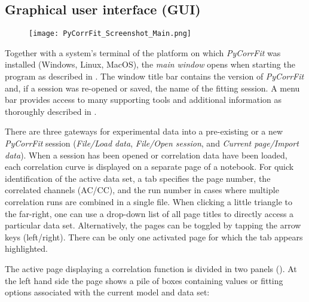 \subsection{Graphical user interface (GUI)}
\label{sec:intro.graph}
\begin{figure}[h]
\centering
\texttt{[image: PyCorrFit\_Screenshot\_Main.png]}
\end{figure}
Together with a system's terminal of the platform on which \textit{PyCorrFit} was installed (Windows, Linux, MacOS), the \textit{main window} opens when starting the program as described in . The window title bar contains the version of \textit{PyCorrFit} and, if a session was re-opened or saved, the name of the fitting session. A menu bar provides access to many supporting tools and additional information as thoroughly described in . 

There are three gateways for experimental data into a pre-existing or a new \textit{PyCorrFit} session (\textit{File/Load data}, \textit{File/Open session}, and \textit{Current page/Import data}). When a session has been opened or correlation data have been loaded, each correlation curve is displayed on a separate page of a notebook. For quick identification of the active data set, a tab specifies the page number, the correlated channels (AC/CC), and the run number in cases where  multiple correlation runs are combined in a single file. When clicking a little triangle to the far-right, one can use a drop-down list of all page titles to directly access a particular data set. Alternatively, the pages can be toggled by tapping the arrow keys (left/right). There can be only one activated page for which the tab appears highlighted.

The active page displaying a correlation function is divided in two panels (). At the left hand side the page shows a pile of boxes containing values or fitting options associated with the current model and data set: 

